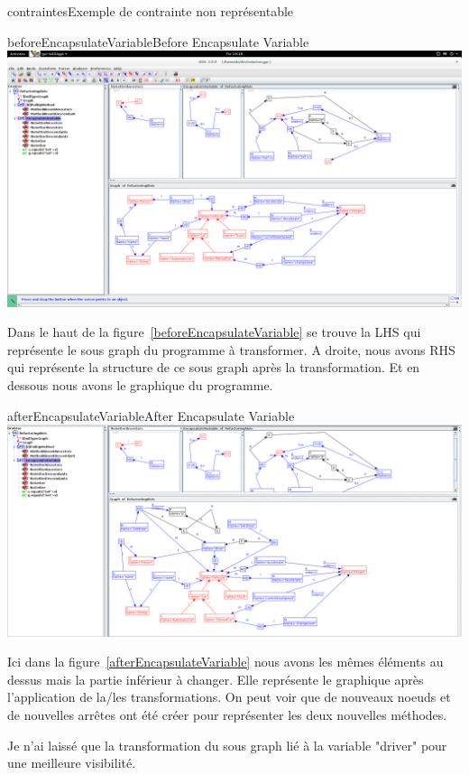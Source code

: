 \documentclass[a4paper, 12pt]{article}
\begin{document}
\begin{figu}{contraintes}{Exemple de contrainte non représentable}
  \begin{myfig}{beforeEncapsulateVariable}{Before Encapsulate Variable}
    \includegraphics[width=\textwidth]{beforeEncapsulateVariable.png}
  \end{myfig}

  Dans le haut de la figure~\ref{beforeEncapsulateVariable} se trouve la LHS qui représente le sous graph du programme à transformer.
  A droite, nous avons RHS qui représente la structure de ce sous graph après la transformation.
  Et en dessous nous avons le graphique du programme.

  \begin{myfig}{afterEncapsulateVariable}{After Encapsulate Variable}
    \includegraphics[width=\textwidth]{afterEncapsulateVariable.png}
  \end{myfig}

  Ici dans la figure~\ref{afterEncapsulateVariable} nous avons les mêmes éléments au dessus mais la partie inférieur à changer.
  Elle représente le graphique après l'application de la/les transformations. On peut voir que de nouveaux noeuds et de nouvelles arrêtes ont été créer pour représenter les deux nouvelles méthodes.

  Je n'ai laissé que la transformation du sous graph lié à la variable "driver" pour une meilleure visibilité.


\end{figu}
\end{document}
